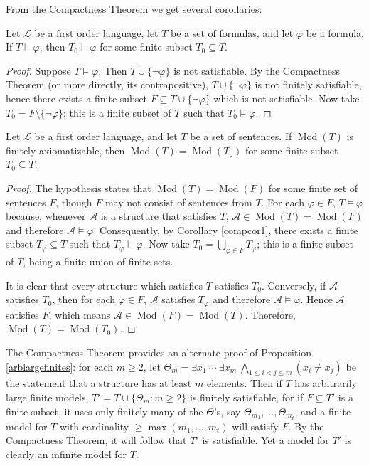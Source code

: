 \documentclass{article}
\def\A{\mathcal A}
\def\Lang{\mathcal L}
\def\Mod{\operatorname{Mod}}
\begin{document}
\noindent From the Compactness Theorem we get several corollaries:
\begin{corollary}\label{compcor1}
Let $\Lang$ be a first order language, let $T$ be a set of formulas, and let $\varphi$ be a formula.  If $T\models\varphi$, then $T_0\models\varphi$ for some finite subset $T_0\subseteq T$.
\end{corollary}
\begin{proof}
Suppose $T\models\varphi$.  Then $T\cup\{\neg\varphi\}$ is not satisfiable.  By the Compactness Theorem (or more directly, its contrapositive), $T\cup\{\neg\varphi\}$ is not finitely satisfiable, hence there exists a finite subset $F\subseteq T\cup\{\neg\varphi\}$ which is not satisfiable.  Now take $T_0=F\setminus\{\neg\varphi\}$; this is a finite subset of $T$ such that $T_0\models\varphi$.
\end{proof}
\begin{corollary}\label{compcor2}
Let $\Lang$ be a first order language, and let $T$ be a set of sentences.  If $\Mod(T)$ is finitely axiomatizable, then $\Mod(T)=\Mod(T_0)$ for some finite subset $T_0\subseteq T$.
\end{corollary}
\begin{proof}
The hypothesis states that $\Mod(T)=\Mod(F)$ for some finite set of sentences $F$, though $F$ may not consist of sentences from $T$.  For each $\varphi\in F$, $T\models\varphi$ because, whenever $\A$ is a structure that satisfies $T$, $\A\in\Mod(T)=\Mod(F)$ and therefore $\A\models\varphi$.  Consequently, by Corollary \ref{compcor1}, there exists a finite subset $T_\varphi\subseteq T$ such that $T_\varphi\models\varphi$.  Now take $T_0=\bigcup_{\varphi\in F}T_\varphi$; this is a finite subset of $T$, being a finite union of finite sets.

It is clear that every structure which satisfies $T$ satisfies $T_0$.  Conversely, if $\A$ satisfies $T_0$, then for each $\varphi\in F$, $\A$ satisfies $T_\varphi$ and therefore $\A\models\varphi$.  Hence $\A$ satisfies $F$, which means $\A\in\Mod(F)=\Mod(T)$.  Therefore, $\Mod(T)=\Mod(T_0)$.
\end{proof}
\noindent The Compactness Theorem provides an alternate proof of Proposition \ref{arblargefinites}: for each $m\ge 2$, let $\Theta_m=\exists x_1~\cdots~\exists x_m~\bigwedge_{1\le i<j\le m}(x_i\ne x_j)$ be the statement that a structure has at least $m$ elements.  Then if $T$ has arbitrarily large finite models, $T'=T\cup\{\Theta_m:m\ge 2\}$ is finitely satisfiable, for if $F\subseteq T'$ is a finite subset, it uses only finitely many of the $\Theta$'s, say $\Theta_{m_1},\dots,\Theta_{m_t}$, and a finite model for $T$ with cardinality $\ge\max(m_1,\dots,m_t)$ will satisfy $F$.  By the Compactness Theorem, it will follow that $T'$ is satisfiable.  Yet a model for $T'$ is clearly an infinite model for $T$.
\end{document}
